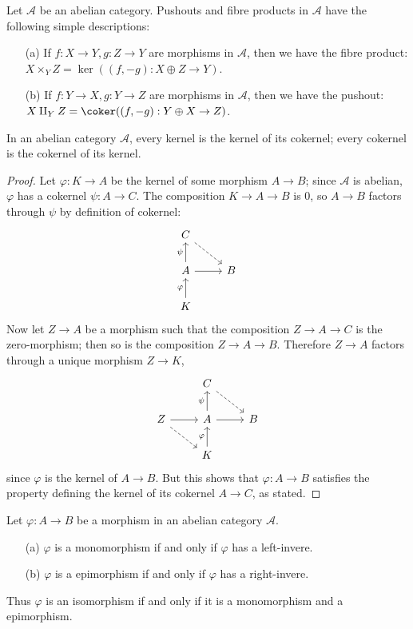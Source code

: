 \begin{example}
Let $\mathcal{A}$ be an abelian category. Pushouts and fibre products in $\mathcal{A}$ have the following simple descriptions:
\begin{enumerate}
\item[(a)] If $f:X\to Y,g:Z\to Y$ are morphisms in $\mathcal{A}$, then we have the fibre product: $X\times_YZ=\ker((f,-g):X\oplus Z\to Y)$.
\item[(b)] If $f:Y\to X,g:Y\to Z$ are morphisms in $\mathcal{A}$, then we have the pushout: $X\amalg_YZ=\coker((f,-g):Y\oplus X\to Z)$.
\end{enumerate}
\end{example}
\begin{lemma}\label{ker is ker of coker}
In an abelian category $\mathcal{A}$, every kernel is the kernel of its cokernel; every cokernel is the cokernel of its kernel.
\end{lemma}
\begin{proof}
Let $\varphi:K\to A$ be the kernel of some morphism $A\to B$; since $\mathcal{A}$ is abelian, $\varphi$ has a cokernel $\psi:A\to C$. The composition $K\to A\to B$ is $0$, so $A\to B$ factors
through $\psi$ by definition of cokernel:
\[\begin{tikzcd}
C\ar[rd,dashed]&\\
A\ar[r]\ar[u,"\psi"]&B\\
K\ar[u,"\varphi"]&
\end{tikzcd}\]
Now let $Z\to A$ be a morphism such that the composition $Z\to A\to C$ is the zero-morphism; then so is the composition $Z\to A\to B$. Therefore $Z\to A$ factors through a unique morphism $Z\to K$,
\[\begin{tikzcd}
&C\ar[rd,dashed]&\\
Z\ar[r]\ar[rd,dashed]&A\ar[r]\ar[u,"\psi"]&B\\
&K\ar[u,"\varphi"]&
\end{tikzcd}\]
since $\varphi$ is the kernel of $A\to B$. But this shows that $\varphi:A\to B$ satisfies the property defining the kernel of its cokernel $A\to C$, as stated.
\end{proof}
\begin{proposition}\label{mono epi iff inverse}
Let $\varphi:A\to B$ be a morphism in an abelian category $\mathcal{A}$.
\begin{enumerate}
\item[(a)] $\varphi$ is a monomorphism if and only if $\varphi$ has a left-invere.
\item[(b)] $\varphi$ is a epimorphism if and only if $\varphi$ has a right-invere.
\end{enumerate}
Thus $\varphi$ is an isomorphism if and only if it is a monomorphism and a epimorphism.
\end{proposition}
